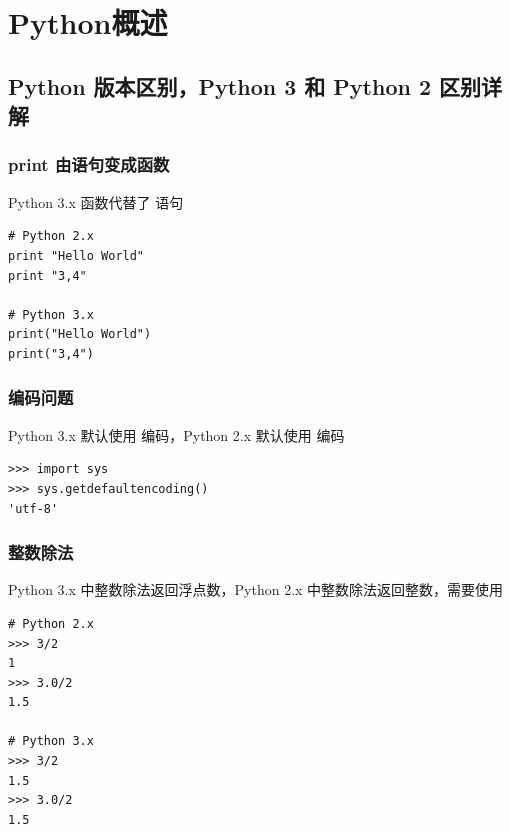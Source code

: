 \chapter{Python概述}
\section{Python 版本区别，Python 3 和 Python 2 区别详解}

\subsection{print 由语句变成函数}
Python 3.x  函数代替了  语句

\begin{lstlisting}[style=demostyle,numbers=none]
# Python 2.x
print "Hello World"
print "3,4"

# Python 3.x
print("Hello World")
print("3,4")
\end{lstlisting}

\subsection{编码问题}
Python 3.x 默认使用  编码，Python 2.x 默认使用  编码

\begin{lstlisting}[style=demostyle,numbers=none]
>>> import sys
>>> sys.getdefaultencoding()
'utf-8'
\end{lstlisting}

\subsection{整数除法}
Python 3.x 中整数除法返回浮点数，Python 2.x 中整数除法返回整数，需要使用 \codeinline{//}
\begin{lstlisting}[style=demostyle,numbers=none]
# Python 2.x
>>> 3/2
1
>>> 3.0/2
1.5

# Python 3.x
>>> 3/2
1.5
>>> 3.0/2
1.5
\end{lstlisting}        

